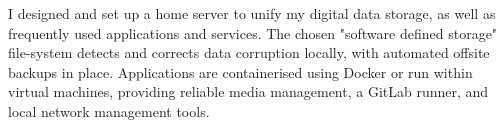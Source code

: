 \descript{ }
\vspace*{-\topsep}  %
\begin{justify}
I designed and set up a home server to unify my digital data storage, as well as frequently used applications and services.
The chosen "software defined storage" file-system detects and corrects data corruption locally, with automated offsite backups in place.
Applications are containerised using Docker or run within virtual machines, providing reliable media management, a GitLab runner, and local network management tools.
\end{justify}